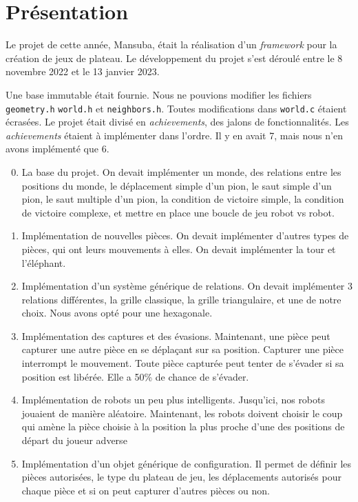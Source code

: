 \section{Présentation}

Le projet de cette année, Mansuba, était la réalisation d'un \emph{framework} pour la création de jeux de plateau.
Le développement du projet s'est déroulé entre le 8 novembre 2022 et le 13 janvier 2023.

Une base immutable était fournie. Nous ne pouvions modifier les fichiers \verb|geometry.h| \verb|world.h| et \verb|neighbors.h|.
Toutes modifications dans \verb|world.c| étaient écrasées.
Le projet était divisé en \emph{achievements}, des jalons de fonctionnalités.
Les \emph{achievements} étaient à implémenter dans l'ordre.
Il y en avait 7, mais nous n'en avons implémenté que 6.

\begin{enumerate}
    \setcounter{enumi}{-1}
    \item La base du projet. On devait implémenter un monde, 
    des relations entre les positions du monde, le déplacement simple d'un pion, 
    le saut simple d'un pion, le saut multiple d'un pion, 
    la condition de victoire simple, la condition de victoire complexe,
    et mettre en place une boucle de jeu robot vs robot.
    \item Implémentation de nouvelles pièces. On devait implémenter d'autres
    types de pièces, qui ont leurs mouvements à elles. On devait implémenter la tour et l'éléphant.
    \item Implémentation d'un système générique de relations. On devait implémenter
    3 relations différentes, la grille classique, la grille triangulaire, et une de notre choix. Nous avons opté pour une hexagonale.
    \item Implémentation des captures et des évasions. Maintenant, une pièce peut capturer une autre pièce
    en se déplaçant sur sa position. Capturer une pièce interrompt le mouvement. Toute pièce capturée
    peut tenter de s'évader si sa position est libérée. Elle a 50\% de chance de s'évader.
    \item Implémentation de robots un peu plus intelligents. Jusqu'ici, nos robots jouaient de manière aléatoire.
    Maintenant, les robots doivent choisir le coup qui amène la pièce choisie à la position la plus proche
    d'une des positions de départ du joueur adverse
    \item Implémentation d'un objet générique de configuration. Il permet de définir 
    les pièces autorisées, le type du plateau de jeu, les déplacements autorisés pour chaque pièce
    et si on peut capturer d'autres pièces ou non. 
\end{enumerate}


